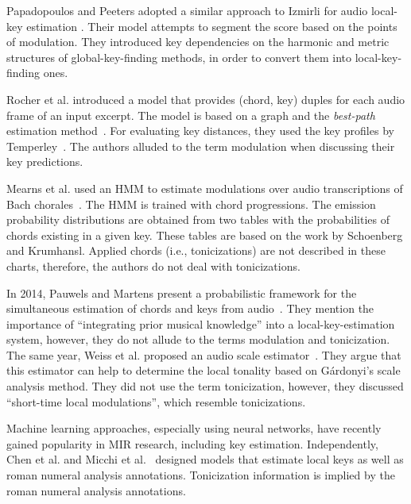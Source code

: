 \documentclass[sigconf]{acmart}
\begin{document}
Papadopoulos and Peeters adopted a similar approach to Izmirli for audio local-key estimation \cite{papadopoulos_local_2009}.
Their model attempts to segment the score based on the points of modulation. 
They introduced key dependencies on the harmonic and metric structures of global-key-finding methods, in order to convert them into local-key-finding ones. 

Rocher et al. introduced a model that provides (chord, key) duples for each audio frame of an input excerpt. 
The model is based on a graph and the \emph{best-path} estimation method~\cite{thomas_rocher_2010_1417485}. 
For evaluating key distances, they used the key profiles by Temperley~\cite{Temperley99:tonality}. The authors alluded to the term modulation when discussing their key predictions.

Mearns et al. used an HMM to estimate modulations over audio transcriptions of Bach chorales~\cite{mearns2011automatically}. 
The HMM is trained with chord progressions. 
The emission probability distributions are obtained from two tables with the probabilities of chords existing in a given key. 
These tables are based on the work by Schoenberg and Krumhansl. 
Applied chords (i.e., tonicizations) are not described in these charts, therefore, the authors do not deal with tonicizations.

In 2014, Pauwels and Martens present a probabilistic framework for the simultaneous estimation of chords and keys from audio~\cite{pauwels_combining_2014}. 
They mention the importance of ``integrating prior musical knowledge'' into a local-key-estimation system, however, they do not allude to the terms modulation and tonicization. 
The same year, Weiss et al. proposed an audio scale estimator~\cite{weiss2014chroma}. 
They argue that this estimator can help to determine the local tonality based on G\'{a}rdonyi's scale analysis method. 
They did not use the term tonicization, however, they discussed ``short-time local modulations'', which resemble tonicizations.

Machine learning approaches, especially using neural networks, have recently gained popularity in MIR research, including key estimation. 
Independently, Chen et al. \cite{chen18harmony,chen19harmony} and Micchi et al.~\cite{Micchi20:roman} designed models that estimate local keys as well as roman numeral analysis annotations. Tonicization information is implied by the roman numeral analysis annotations. 
\end{document}
